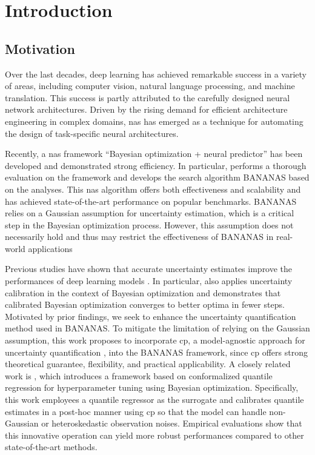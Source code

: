 \documentclass[a4paper,oneside,bibliography=totoc]{scrbook}
\begin{document}
\begingroup%
\hypersetup{hidelinks} %
\tableofcontents%
\endgroup


\mainmatter  %

\chapter{Introduction}
\label{ch:intro}

\section{Motivation}
Over the last decades, deep learning has achieved remarkable success in a variety of areas, including computer vision, natural language processing, and machine translation. This success is partly attributed to the carefully designed neural network architectures. Driven by the rising demand for efficient architecture engineering in complex domains, \gls{nas} has emerged as a technique for automating the design of task-specific neural architectures.

Recently, a \gls{nas} framework “Bayesian optimization + neural predictor” has been developed and demonstrated strong efficiency. In particular, \cite{white2019bananas}  performs a thorough evaluation on the framework and develops the search algorithm BANANAS based on the analyses. This \gls{nas} algorithm offers both effectiveness and scalability and has achieved state-of-the-art performance on popular benchmarks. BANANAS relies on a Gaussian assumption for uncertainty estimation, which is a critical step in the Bayesian optimization process. However, this assumption does not necessarily hold and thus may restrict the effectiveness of BANANAS in real-world applications

Previous studies have shown that accurate uncertainty estimates improve the performances of deep learning models \cite{pmlr-v80-kuleshov18a}. In particular, \cite{deshpande2024online} also applies uncertainty calibration in the context of Bayesian optimization and demonstrates that calibrated Bayesian optimization converges to better optima in fewer steps. Motivated by prior findings, we seek to enhance the uncertainty quantification method used in BANANAS. To mitigate the limitation of relying on the Gaussian assumption, this work proposes to incorporate \gls{cp},  a model-agnostic approach for uncertainty quantification \cite{shafer2008tutorial, vovk2005algorithmic}, into the BANANAS framework, since \gls{cp} offers strong theoretical guarantee, flexibility, and practical applicability. A closely related work is \cite{salinas2023optimizing}, which introduces a framework based on conformalized quantile regression for hyperparameter tuning using Bayesian optimization. Specifically, this work employees a quantile regressor as the surrogate and calibrates quantile estimates in a post-hoc manner using \gls{cp} so that the model can handle non-Gaussian or heteroskedastic observation noises. Empirical evaluations show that this innovative operation can yield more robust performances compared to other state-of-the-art methods.
\end{document}
